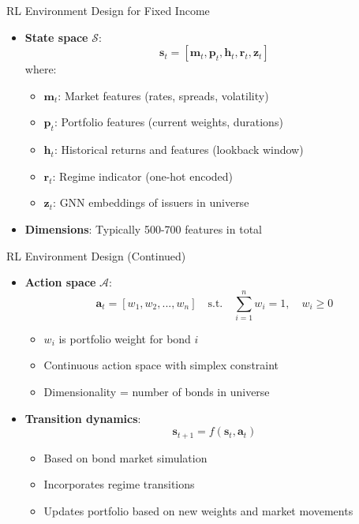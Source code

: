 \documentclass{beamer}
\begin{document}
\begin{frame}{RL Environment Design for Fixed Income}
\begin{itemize}
    \item \textbf{State space} $\mathcal{S}$:
    \begin{equation}
    \mathbf{s}_t = [\mathbf{m}_t, \mathbf{p}_t, \mathbf{h}_t, \mathbf{r}_t, \mathbf{z}_t]
    \end{equation}
    where:
    \begin{itemize}
        \item $\mathbf{m}_t$: Market features (rates, spreads, volatility)
        \item $\mathbf{p}_t$: Portfolio features (current weights, durations)
        \item $\mathbf{h}_t$: Historical returns and features (lookback window)
        \item $\mathbf{r}_t$: Regime indicator (one-hot encoded)
        \item $\mathbf{z}_t$: GNN embeddings of issuers in universe
    \end{itemize}
    \item \textbf{Dimensions}: Typically 500-700 features in total
\end{itemize}
\end{frame}

\begin{frame}{RL Environment Design (Continued)}
\begin{itemize}
    \item \textbf{Action space} $\mathcal{A}$:
    \begin{equation}
    \mathbf{a}_t = [w_1, w_2, ..., w_n] \quad \text{s.t.} \quad \sum_{i=1}^n w_i = 1, \quad w_i \geq 0
    \end{equation}
    \begin{itemize}
        \item $w_i$ is portfolio weight for bond $i$
        \item Continuous action space with simplex constraint
        \item Dimensionality = number of bonds in universe
    \end{itemize}
    
    \item \textbf{Transition dynamics}:
    \begin{equation}
    \mathbf{s}_{t+1} = f(\mathbf{s}_t, \mathbf{a}_t)
    \end{equation}
    \begin{itemize}
        \item Based on bond market simulation
        \item Incorporates regime transitions
        \item Updates portfolio based on new weights and market movements
    \end{itemize}
\end{itemize}
\end{frame}
\end{document}
